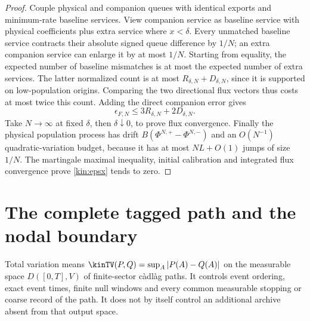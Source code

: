 \documentclass[11pt,oneside,openany]{book}
\theoremstyle{definition}
\theoremstyle{remark}\newtheorem{remark}[theorem]{Remark}
\begin{document}
\begin{proof}
Couple physical and companion queues with identical exports and
minimum-rate baseline services. View companion service as baseline
service with physical coefficients plus extra service where $x<\delta$.
Every unmatched baseline service contracts their absolute signed queue
difference by $1/N$; an extra companion service can enlarge it by at most
$1/N$. Starting from equality, the expected number of baseline mismatches
is at most the expected number of extra services. The latter normalized
count is at most $R_{\delta,N}+D_{\delta,N}$, since it is supported on
low-population origins. Comparing the two directional flux vectors thus
costs at most twice this count. Adding the direct companion error gives
\begin{equation}
 \epsilon_{F,N}\le3R_{\delta,N}+2D_{\delta,N}.
 \label{kin:fluxbridge}
\end{equation}
Take $N\to\infty$ at fixed $\delta$, then $\delta\downarrow0$, to prove
flux convergence. Finally the physical population process has drift
$B(\Phi^{N,+}-\Phi^{N,-})$ and an $O(N^{-1})$ quadratic-variation budget,
because it has at most $NL+O(1)$ jumps of size $1/N$. The martingale
maximal inequality, initial calibration and integrated flux convergence
prove \eqref{kin:epsx} tends to zero.
\end{proof}

\section{The complete tagged path and the nodal boundary}
Total variation means $\kinTV(P,Q)=\sup_A|P(A)-Q(A)|$ on the measurable
space $D([0,T],V)$ of finite-sector c\`adl\`ag paths. It controls event
ordering, exact event times, finite null windows and every common measurable
stopping or coarse record of the path. It does not by itself control an
additional archive absent from that output space.
\end{document}
